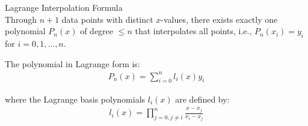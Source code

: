 \begin{theorem}{Lagrange Interpolation Formula}\\
Through $n+1$ data points with distinct $x$-values, there exists exactly one polynomial $P_n(x)$ of degree $\leq n$ that interpolates all points, i.e., $P_n(x_i) = y_i$ for $i=0,1,\ldots,n$.

The polynomial in Lagrange form is:
\begin{align*}
P_n(x) = \sum_{i=0}^{n} l_i(x)y_i
\end{align*}

where the Lagrange basis polynomials $l_i(x)$ are defined by:
\begin{align*}
l_i(x) = \prod_{j=0, j\neq i}^{n} \frac{x - x_j}{x_i - x_j}
\end{align*}
\end{theorem}

